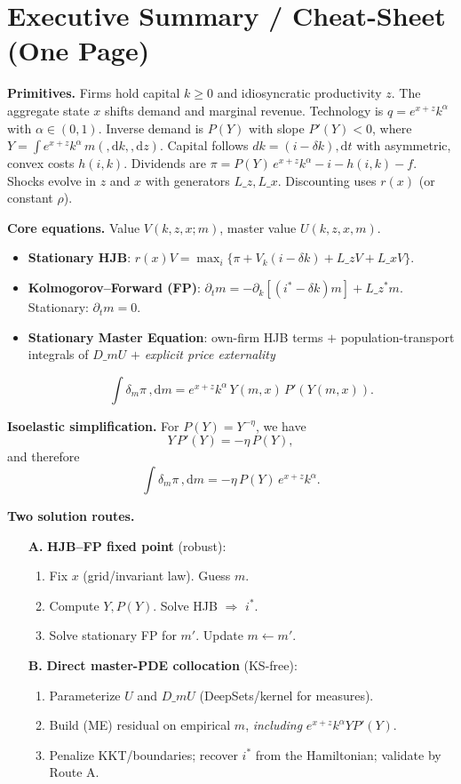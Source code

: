 \documentclass[11pt,letterpaper,oneside]{article}
\numberwithin{equation}{section}
\newcommand{\1}{\mathbf{1}}
\newcommand{\diff}{,\mathrm{d}}
\newcommand{\Lz}{L\_z}
\newcommand{\Lx}{L\_x}
\newcommand{\Lzadj}{L\_z^{\!*}}
\newcommand{\dmU}{D\_m U}
\begin{document}
\section*{Executive Summary / Cheat-Sheet (One Page)}
\begin{tcolorbox}[didacticstyle]
\textbf{Primitives.} Firms hold capital $k\!\ge 0$ and idiosyncratic productivity $z$. The aggregate state $x$ shifts demand and marginal revenue. Technology is $q=e^{x+z}k^\alpha$ with $\alpha\in(0,1)$. Inverse demand is $P(Y)$ with slope $P'(Y)<0$, where $Y=\int e^{x+z}k^\alpha\,m(\diff k,\diff z)$. Capital follows $dk=(i-\delta k)\diff t$ with asymmetric, convex costs $h(i,k)$. Dividends are $\pi = P(Y)\,e^{x+z}k^\alpha - i - h(i,k) - f$. Shocks evolve in $z$ and $x$ with generators $\Lz,\Lx$. Discounting uses $r(x)$ (or constant $\rho$).
\medskip

\textbf{Core equations.} Value $V(k,z,x;m)$, master value $U(k,z,x,m)$.
\begin{itemize}[leftmargin=1.25em]
\item \textbf{Stationary HJB}: $r(x)V=\max_i\{\pi+V_k(i-\delta k)+\Lz V+\Lx V\}$.
\item \textbf{Kolmogorov--Forward (FP)}: $\partial_t m=-\partial_k[(i^*-\delta k)m]+\Lzadj m$. Stationary: $\partial_t m=0$.
\item \textbf{Stationary Master Equation}: own-firm HJB terms $+$ population-transport integrals of $\dmU$ $+$ \emph{explicit price externality}

$$
\int \delta_m \pi\,\diff m = e^{x+z}k^\alpha\,Y(m,x)\,P'(Y(m,x)).
$$

\end{itemize}


\textbf{Isoelastic simplification.} For $P(Y)=Y^{-\eta}$, we have
\[
Y\,P'(Y)=-\eta\,P(Y),
\]
and therefore
\[
\int \delta_m \pi\,\diff m = -\eta\,P(Y)\,e^{x+z}k^\alpha.
\]

\textbf{Two solution routes.}
\begin{enumerate}[leftmargin=1.25em]
\item[\textbf{A.}] \textbf{HJB--FP fixed point} (robust):
\begin{enumerate}[leftmargin=1em,label*=\arabic*.]
\item Fix $x$ (grid/invariant law). Guess $m$.
\item Compute $Y,P(Y)$. Solve HJB $\Rightarrow$ $i^*$.
\item Solve stationary FP for $m'$. Update $m\leftarrow m'$.
\end{enumerate}
\item[\textbf{B.}] \textbf{Direct master-PDE collocation} (KS-free):
\begin{enumerate}[leftmargin=1em,label*=\arabic*.]
\item Parameterize $U$ and $\dmU$ (DeepSets/kernel for measures).
\item Build (ME) residual on empirical $m$, \emph{including} $e^{x+z}k^\alpha Y P'(Y)$.
\item Penalize KKT/boundaries; recover $i^*$ from the Hamiltonian; validate by Route A.
\end{enumerate}
\end{enumerate}


\end{tcolorbox}
\end{document}
